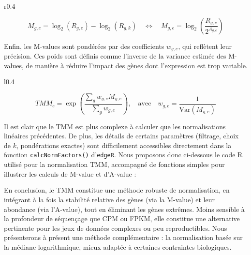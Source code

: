 \begin{wrapfigure}{r}{0.4\textwidth}
\vspace{-10mm}
\begin{tcolorbox}[colback=lightgray,colframe=darkblue,boxrule=0.5pt,arc=2pt,boxsep=5pt,width=0.40\textwidth,title=\center A-value (TMM),fonttitle=\bfseries\small]
\begin{equation*}
M_{g,e} = \log_2(R_{g,e}) - \log_2(R_{g,k}) \quad \Longleftrightarrow \quad M_{g,e} = \log_2\left( \frac{R_{g,e}}{2^{A_{g,e}}} \right)
\end{equation*}
\end{tcolorbox}
\end{wrapfigure}

Enfin, les M-values sont pondérées par des coefficients \(w_{g,e}\), qui reflètent leur précision. Ces poids sont définis comme l'inverse de la variance estimée des M-values, de manière à réduire l’impact des gènes dont l’expression est trop variable.

\begin{wrapfigure}{l}{0.4\textwidth}
\vspace{-10mm}
\begin{tcolorbox}[colback=lightgray,colframe=lightgray,boxrule=0.5pt,arc=2pt,boxsep=5pt,width=0.40\textwidth,title=\center Pondération des M-Value,fonttitle=\bfseries\small]
\begin{equation*}
TMM_e = \exp \left( \frac{\sum_{g} w_{g,e} M_{g,e}}{\sum_{g} w_{g,e}} \right), \quad \text{avec} \quad w_{g,e} = \frac{1}{\text{Var}(M_{g,e})}
\end{equation*}
\end{tcolorbox}
\end{wrapfigure}

Il est clair que le TMM est plus complexe à calculer que les normalisations linéaires précédentes. De plus, les détails de certains paramètres (filtrage, choix de \(k\), pondérations exactes) sont difficilement accessibles directement dans la fonction \texttt{calcNormFactors()} d’\texttt{edgeR}. Nous proposons donc ci-dessous le code R utilisé pour la normalisation TMM, accompagné de fonctions simples pour illustrer les calculs de M-value et d’A-value :

En conclusion, le TMM constitue une méthode robuste de normalisation, en intégrant à la fois la stabilité relative des gènes (via la M-value) et leur abondance (via l’A-value), tout en éliminant les gènes extrêmes. Moins sensible à la profondeur de séquençage que CPM ou FPKM, elle constitue une alternative pertinente pour les jeux de données complexes ou peu reproductibles. Nous présenterons à présent une méthode complémentaire : la normalisation basée sur la médiane logarithmique, mieux adaptée à certaines contraintes biologiques.

